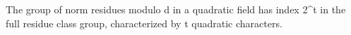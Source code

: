 The group of norm residues modulo d in a quadratic field has index 2^t in the full residue class group, characterized by t quadratic characters.
